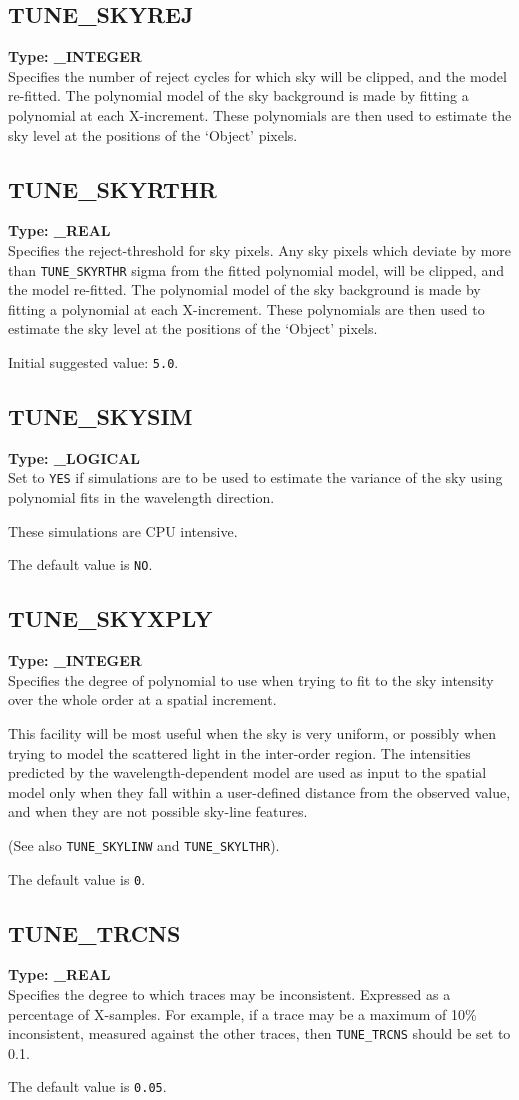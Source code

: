 \documentclass[11pt,twoside]{article}
\makeatletter
\newcommand{\htmlref}[2]{#1}
\newcommand{\xlabel}[1]{}
\newcommand{\indexcmdname}[1]{\index{#1@\protect\cmdname{#1}}}
\renewcommand{\indexcmdname}[1]{}
\newcommand{\cmdname}{\begingroup \catcode`\_=12 \realcmdname}
\newcommand{\realcmdname}[1]{\endgroup\texttt{#1}}
\newcommand{\echparameter}[4]
{
\item [#1 = #3] \mbox{}\label{par_#2}\indexcmdname{#2}
\\
#4
}
\renewcommand{\echparameter}[4]
{
  \subsection{\xlabel{par_#2}\label{par_#2}{\bf #1}}
  {\bf Type: #3}\\
#4
}
\makeatother
\begin{document}
\echparameter{TUNE\_SKYREJ}{TUNE_SKYREJ}{
 \_INTEGER
}{
 Specifies the number of reject cycles for which sky will be
 clipped, and the model re-fitted.  The polynomial model of the sky
 background is made by fitting a polynomial at each X-increment.
 These polynomials are then used to estimate the sky level at the
 positions of the `Object' pixels.
}

\echparameter{TUNE\_SKYRTHR}{TUNE_SKYRTHR}{
 \_REAL
}{
 Specifies the reject-threshold for sky pixels.  Any sky pixels
 which deviate by more than {\tt TUNE\_SKYRTHR} sigma from the fitted
 polynomial model, will be clipped, and the model re-fitted.  The
 polynomial model of the sky background is made by fitting a
 polynomial at each X-increment.  These polynomials are then used to
 estimate the sky level at the positions of the `Object' pixels.

 Initial suggested value: \texttt{5.0}.
}

\echparameter{TUNE\_SKYSIM}{TUNE_SKYSIM}{
 \_LOGICAL
}{
 Set to \texttt{YES} if simulations are to be used to estimate the variance
 of the sky using polynomial fits in the wavelength direction.

 These simulations are CPU intensive.

 The default value is \texttt{NO}.
}

\echparameter{TUNE\_SKYXPLY}{TUNE_SKYXPLY}{
 \_INTEGER
}{
 Specifies the degree of polynomial to use when trying to fit to the
 sky intensity over the whole order at a spatial increment.

 This facility will be most useful when the sky is very uniform, or
 possibly when trying to model the scattered light in the inter-order
 region.  The intensities predicted by the wavelength-dependent model
 are used as input to the spatial model only when they fall within a
 user-defined distance from the observed value, and when they are not
 possible sky-line features.

 (See also \htmlref{{\tt TUNE\_SKYLINW}}{par_TUNE_SKYLINW} and
 \htmlref{{\tt TUNE\_SKYLTHR}}{par_TUNE_SKYLTHR}).

 The default value is \texttt{0}.
}

\echparameter{TUNE\_TRCNS}{TUNE_TRCNS}{
 \_REAL
}{
 Specifies the degree to which traces may be inconsistent.
 Expressed as a percentage of X-samples.  For example, if a trace may
 be a maximum of 10\% inconsistent, measured against the other traces,
 then {\tt TUNE\_TRCNS} should be set to 0.1.

 The default value is \texttt{0.05}.
}
\end{document}
